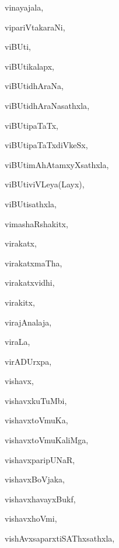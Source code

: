\begin{multicols}{3}
{\noindent
{vinayajala}, \pageref{vinayajala}

\noindent
{vipariVtakaraNi}, \pageref{vipariVtakaraNi}

\noindent
{viBUti}, \pageref{viBUti}

\noindent
{viBUtikalapx}, \pageref{viBUtikalapx}

\noindent
{viBUtidhAraNa}, \pageref{viBUtidhAraNa}

\noindent
{viBUtidhAraNasathxla}, \pageref{viBUtidhAraNasathxla}

\noindent
{viBUtipaTaTx}, \pageref{viBUtipaTaTx}

\noindent
{viBUtipaTaTxdiVkeSx}, \pageref{viBUtipaTaTxdiVkeSx}

\noindent
{viBUtimAhAtamxyXsathxla}, \pageref{viBUtimAhAtamxyXsathxla}

\noindent
{viBUtiviVLeya(Layx)}, \pageref{viBUtiviVLeyaLayx}

\noindent
{viBUtisathxla}, \pageref{viBUtisathxla}

\noindent
{vimashaRshakitx}, \pageref{vimashaRshakitx}

\noindent
{virakatx}, \pageref{virakatx}

\noindent
{virakatxmaTha}, \pageref{virakatxmaTha}

\noindent
{virakatxvidhi}, \pageref{virakatxvidhi}

\noindent
{virakitx}, \pageref{virakitx}

\noindent
{virajAnalaja}, \pageref{virajAnalaja}

\noindent
{viraLa}, \pageref{viraLa}

\noindent
{virADUrxpa}, \pageref{virADUrxpa}

\noindent
{vishavx}, \pageref{vishavx}

\noindent
{vishavxkuTuMbi}, \pageref{vishavxkuTuMbi}

\noindent
{vishavxtoVmuKa}, \pageref{vishavxtoVmuKa}

\noindent
{vishavxtoVmuKaliMga}, \pageref{vishavxtoVmuKaliMga}

\noindent
{vishavxparipUNaR}, \pageref{vishavxparipUNaR}

\noindent
{vishavxBoVjaka}, \pageref{vishavxBoVjaka}

\noindent
{vishavxhavayxBukf}, \pageref{vishavxhavayxBukf}

\noindent
{vishavxhoVmi}, \pageref{vishavxhoVmi}

\noindent
{vishAvxsaparxtiSAThxsathxla}, \pageref{vishAvxsaparxtiSAThxsathxla}

}
\end{multicols}

